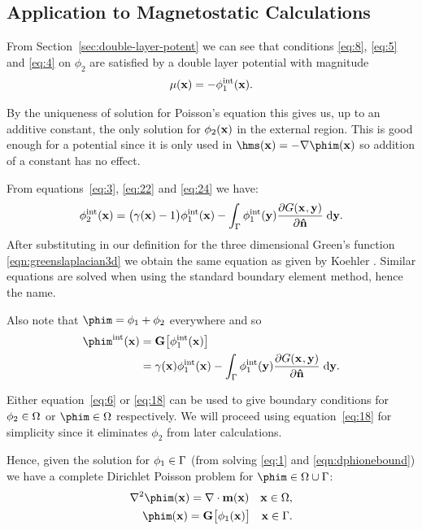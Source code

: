 \subsection{Application to Magnetostatic Calculations}
From Section~\ref{sec:double-layer-potent} we can see that conditions \eqref{eq:8}, \eqref{eq:5} and \eqref{eq:4} on $\phi_2$ are satisfied by a double layer potential with magnitude
\begin{equation}
  \label{eq:24}
  \mu(\mathbf{x}) = - \phi^{\text{int}}_1(\mathbf{x}).
\end{equation}

By the uniqueness of solution for Poisson's equation this gives us, up to an additive constant, the only solution for $\phi_2(\mathbf{x})$ in the external region.
This is good enough for a potential since it is only used in $\hms(\xv) = - \nabla \phim(\xv)$ so addition of a constant has no effect.

From equations~\eqref{eq:3}, \eqref{eq:22} and \eqref{eq:24} we have:
\begin{equation}
  \label{eq:6}
  \phi^{\text{int}}_2(\mathbf{x}) =  \big(\gamma(\mathbf{x}) - 1 \big) \phi^{\text{int}}_1(\mathbf{x})
  - \int_{{\Gamma}} \phi^{\text{int}}_1(\mathbf{y}) \frac{\partial G(\mathbf{x}_{},\mathbf{y})}{\partial \mathbf{\hat{n}}} {\; \text{d}} \mathbf{y}.
\end{equation}
After substituting in our definition for the three dimensional Green's function \eqref{eqn:greenslaplacian3d} we obtain the same equation as given by Koehler \cite{Koehler1997}.
Similar equations are solved when using the standard boundary element method, hence the name.

Also note that $\phim = \phi_1 + \phi_2$ everywhere and so
\begin{align}
  \label{eq:18}
  \phim^\inte(\xv) &= \bm \big[ \phi^\inte_1(\xv) \big] \\
  &= \gamma(\xv) \phi^\inte_1(\xv)
  - \int_{\boundd} \phi^\inte_1(\yv) \pd{\Green}{\nv} \d \yv. \notag
\end{align}

Either equation~\eqref{eq:6} or \eqref{eq:18} can be used to give boundary conditions for $\phi_2 \in \Omega$ or $\phim \in \magd$ respectively. We will proceed using equation~\eqref{eq:18} for simplicity since it eliminates $\phi_2$ from later calculations.

 Hence, given the solution for $\phi_1 \in {\Gamma}$ (from solving \eqref{eq:1} and \eqref{eqn:dphionebound}) we have a complete Dirichlet Poisson problem for $\phim \in \magd \cup \boundd$:
\begin{align}
  \label{eq:phim-bem}
  \nabla^2 \phim(\xv) = \nabla \cdot \mv(\xv) \quad \xv \in \magd, \\
  \phim(\xv) = \bm \big[ \phi_1(\xv) \big] \quad \xv \in \boundd.
\end{align}

